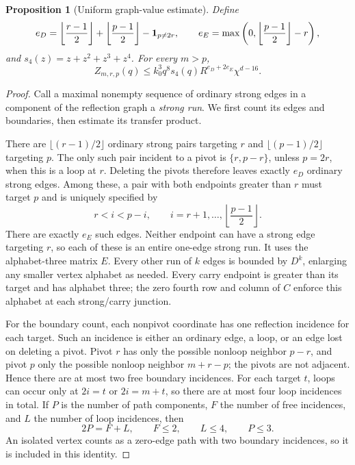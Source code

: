 \documentclass[11pt]{amsart}
\newtheorem{proposition}[theorem]{Proposition}
\theoremstyle{definition}
\theoremstyle{remark}
\numberwithin{equation}{section}
\begin{document}
\begin{proposition}[Uniform graph-value estimate]\label{raw:pointwise}
Define
\[
 e_D=\left\lfloor\frac{r-1}{2}\right\rfloor+
     \left\lfloor\frac{p-1}{2}\right\rfloor-{\bf1}_{p\ne2r},
 \qquad
 e_E=\max\left(0,\left\lfloor\frac{p-1}{2}\right\rfloor-r\right),
\]
and $s_4(z)=z+z^2+z^3+z^4$.  For every $m>p$,
\begin{equation}\label{raw:value}
 Z_{m,r,p}(q)\le k_0^3q^8s_4(q)R^{e_D+2e_E}\chi^{d-16}.
\end{equation}
\end{proposition}
\begin{proof}
Call a maximal nonempty sequence of ordinary strong edges in a component
of the reflection graph a \emph{strong run}.  We first count its edges
and boundaries, then estimate its transfer product.

There are $\lfloor(r-1)/2\rfloor$ ordinary strong pairs targeting $r$
and $\lfloor(p-1)/2\rfloor$ targeting $p$.  The only such pair incident
to a pivot is $\{r,p-r\}$, unless $p=2r$, when this is a loop at $r$.
Deleting the pivots therefore leaves exactly $e_D$ ordinary strong edges.
Among these, a pair with both endpoints greater than $r$ must target $p$
and is uniquely specified by
\[
 r<i<p-i,\qquad
 i=r+1,\ldots,\left\lfloor\frac{p-1}{2}\right\rfloor.
\]
There are exactly $e_E$ such edges.  Neither endpoint can have a strong
edge targeting $r$, so each of these is an entire one-edge strong run.
It uses the alphabet-three matrix $E$.  Every other run of $k$ edges
is bounded by $D^k$, enlarging any smaller vertex alphabet as needed.
Every carry endpoint is greater than its target and has alphabet three;
the zero fourth row and column of $C$ enforce this alphabet at each
strong/carry junction.

For the boundary count, each nonpivot coordinate has one reflection
incidence for each target.  Such an incidence is either an ordinary
edge, a loop, or an edge lost on deleting a pivot.  Pivot $r$ has only
the possible nonloop neighbor $p-r$, and pivot $p$ only the possible
nonloop neighbor $m+r-p$; the pivots are not adjacent.  Hence there
are at most two free boundary incidences.  For each target $t$, loops
can occur only at $2i=t$ or $2i=m+t$, so there are at most four loop
incidences in total.  If $P$ is the number of path components, $F$ the
number of free incidences, and $L$ the number of loop incidences, then
\[
 2P=F+L,\qquad F\le2,\qquad L\le4,\qquad P\le3.
\]
An isolated vertex counts as a zero-edge path with two boundary
incidences, so it is included in this identity.


\end{proof}
\end{document}
